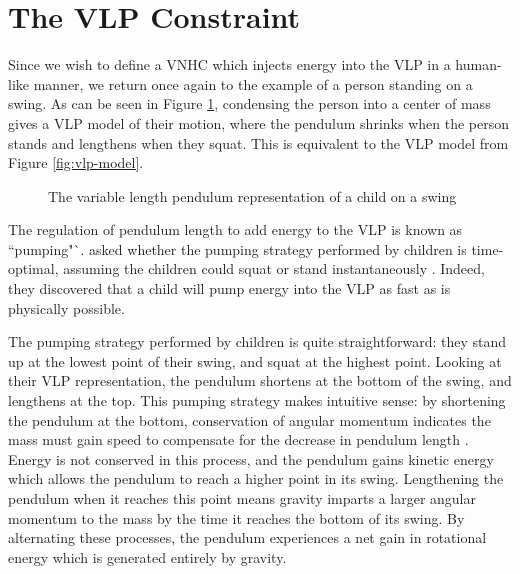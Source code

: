 \section{The VLP Constraint}
Since we wish to define a VNHC which injects energy into the VLP in a human-like
manner,
we return once again to the example of a person standing on a swing.
As can be seen in Figure \ref{fig:child-vlp}, condensing the person 
into a center of mass gives a VLP model of their motion, where
the pendulum shrinks when the person stands and lengthens when they squat. This
is equivalent to the VLP model from Figure \ref{fig:vlp-model}.
\begin{figure}
   \centering
   \begin{subfigure}[t]{0.5\textwidth}
   \end{subfigure}
   \begin{subfigure}[t]{0.5\textwidth}
   \end{subfigure}
   \caption{The variable length pendulum representation of a child on a
   swing}\label{fig:child-vlp}
\end{figure}

The regulation of pendulum length to add energy to the VLP is known as
``pumping"`. \citeauthor{pumping_swing_standing_squatting} asked whether
the pumping strategy performed by children is time-optimal, assuming the
children could squat or stand instantaneously
\cite{pumping_swing_standing_squatting}. Indeed, they discovered that 
a child will pump energy into the VLP as fast as is physically possible. 

The pumping strategy performed by children is quite 
straightforward: they stand up at the lowest point of their swing, and squat at
the highest point. Looking at their VLP representation, the pendulum shortens
at the bottom of the swing, and lengthens at the top. 
This pumping strategy makes intuitive sense:
by shortening the pendulum at the bottom, conservation of angular momentum indicates the
mass must gain speed to compensate for the decrease in pendulum length
\cite{how_to_pump_a_swing}.
Energy is not conserved in this process, and the pendulum gains kinetic energy
which allows the pendulum to reach a higher point in its swing.
Lengthening the pendulum when it reaches this point means gravity
imparts a larger angular momentum to the mass by the time it reaches the bottom
of its swing.
By alternating these processes, the pendulum experiences a net gain in
rotational energy which is generated entirely by gravity.

